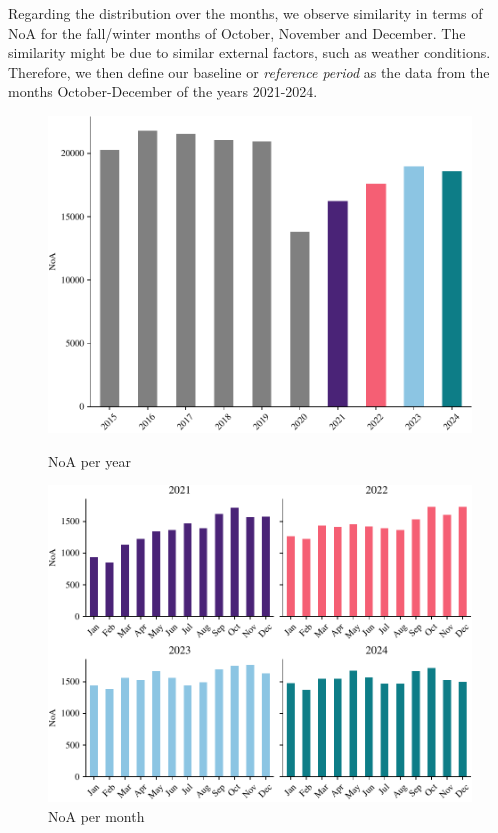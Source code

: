 \documentclass{article}
\begin{document}
Regarding the distribution over the months, we observe similarity in terms of
NoA for the fall/winter months of October, November and December. The similarity
might be due to similar external factors, such as weather conditions. Therefore,
we then define our baseline or \emph{reference period} as the data from the
months October-December of the years 2021-2024.

\begin{figure}[H]
  \centering
  \begin{minipage}[t]{0.45\textwidth}
    \includegraphics[width=\textwidth]{../fig/accidents_per_year.pdf}
    \caption{NoA per year}\label{fig:accidents_per_year}
  \end{minipage}
  \hspace{0.5cm}
  \begin{minipage}[t]{0.45\textwidth}
    \includegraphics[width=\textwidth]{../fig/accidents_per_month.pdf}
    \caption{NoA per month}\label{fig:accidents_per_month}
  \end{minipage}
\end{figure}
\end{document}
